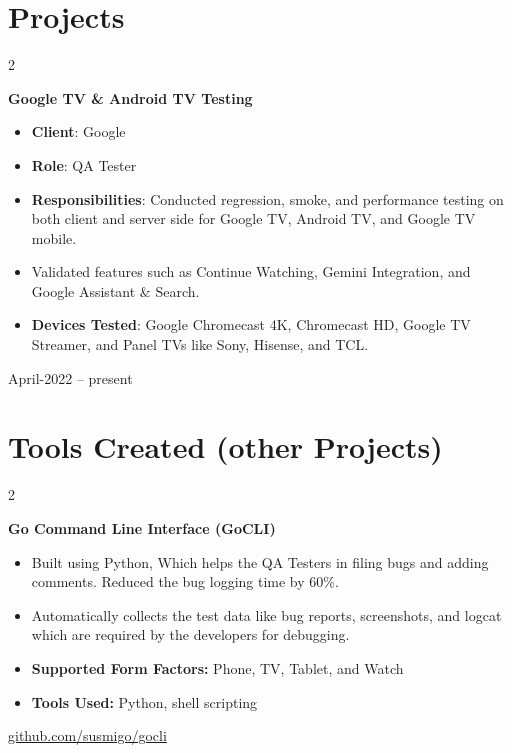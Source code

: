 \documentclass[10pt, letterpaper]{article}
\newenvironment{highlights}{
    \begin{itemize}[
        topsep=0.10 cm,
        parsep=0.10 cm,
        partopsep=0pt,
        itemsep=0pt,
        leftmargin=0.4 cm + 10pt
    ]
}{
    \end{itemize}
} %
\newenvironment{twocolentry}[2][]{
    \onecolentry
    \def\secondColumn{#2}
    \setcolumnwidth{\fill, 4.5 cm}
    \begin{paracol}{2}
}{
    \switchcolumn \raggedleft \secondColumn
    \end{paracol}
    \endonecolentry
} %
\begin{document}
    
    \section{Projects}



        
        \begin{twocolentry}{
            April-2022 -- present
        }
            \textbf{Google TV \& Android TV Testing}
            \begin{highlights}
                \item \textbf{Client}: Google
                \item \textbf{Role}: QA Tester
                \item \textbf{Responsibilities}: Conducted regression, smoke, and performance testing on both client and server side for Google TV, Android TV, and Google TV mobile.
                \item Validated features such as Continue Watching, Gemini Integration, and Google Assistant \& Search.
                \item \textbf{Devices Tested}: Google Chromecast 4K, Chromecast HD, Google TV Streamer, and Panel TVs like Sony, Hisense, and TCL.
            \end{highlights}
        \end{twocolentry}



    
    \section{Tools Created (other Projects)}



        
        \begin{twocolentry}{
            \href{https://susmigo.github.io/gocli_guide/}{github.com/susmigo/gocli}
        }
            \textbf{Go Command Line Interface (GoCLI)}
            \begin{highlights}
                \item Built using Python, Which helps the QA Testers in filing bugs and adding comments. Reduced the bug logging time by 60\%.
                \item Automatically collects the test data like bug reports, screenshots, and logcat which are required by the developers for debugging.
                \item \textbf{Supported Form Factors:} Phone, TV, Tablet, and Watch
                \item \textbf{Tools Used:} Python, shell scripting
            \end{highlights}
        \end{twocolentry}
\end{document}
